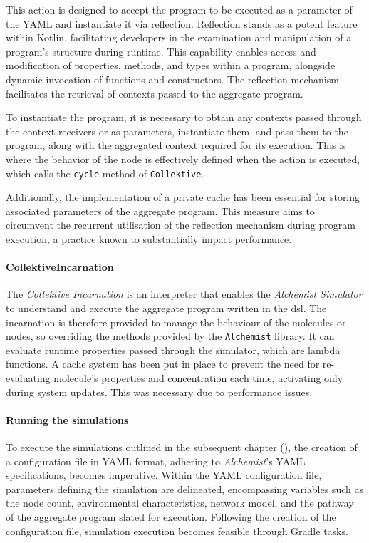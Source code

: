 This action is designed to accept the program to be executed as a parameter of the YAML and instantiate it via reflection.
Reflection stands as a potent feature within Kotlin, facilitating developers in the examination and manipulation of a program's structure during runtime.
This capability enables access and modification of properties, methods, and types within a program, alongside dynamic invocation of functions and constructors.
The reflection mechanism facilitates the retrieval of contexts passed to the aggregate program.

To instantiate the program, it is necessary to obtain any contexts passed through the context receivers or as parameters,
instantiate them, and pass them to the program, along with the aggregated context required for its execution.
This is where the behavior of the node is effectively defined when the action is executed, which calls the \texttt{cycle} method of \texttt{Collektive}.

Additionally, the implementation of a private cache has been essential for storing associated parameters of the aggregate program.
This measure aims to circumvent the recurrent utilisation of the reflection mechanism during program execution, a practice known to substantially impact performance.

\paragraph{CollektiveIncarnation}
The \emph{Collektive Incarnation} is an interpreter that enables the \emph{Alchemist Simulator} to understand and execute
the aggregate program written in the \ac{dsl}.
The incarnation is therefore provided to manage the behaviour of the molecules or nodes, so overriding the methods
provided by the \texttt{Alchemist} library.
It can evaluate runtime properties passed through the simulator, which are lambda functions.
A cache system has been put in place to prevent the need for re-evaluating molecule's properties and concentration each time,
activating only during system updates.
This was necessary due to performance issues.

\paragraph{Running the simulations}
To execute the simulations outlined in the subsequent chapter (), the creation of a
configuration file in YAML format, adhering to \emph{Alchemist}'s YAML specifications, becomes imperative. %
Within the YAML configuration file, parameters defining the simulation are delineated, encompassing variables such as
the node count, environmental characteristics, network model, and the pathway of the aggregate program slated for execution.
Following the creation of the configuration file, simulation execution becomes feasible through Gradle tasks.

